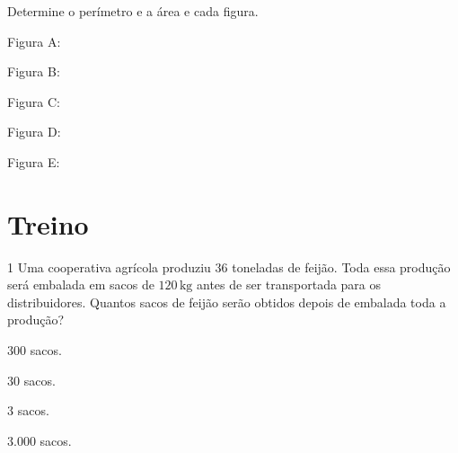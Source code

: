 {{{{\begin{escolha}
{Determine o perímetro e a área e cada figura.

\begin{escolha}
\item Figura A: 
\item Figura B: 
\item Figura C: 
\item Figura D: 
\item Figura E: 
\end{escolha}

\begin{mdframed}[linewidth=2pt,linecolor=white,roundcorner=10pt]
\vspace{6cm}
\end{mdframed}

\section*{Treino}

\num{1} Uma cooperativa agrícola produziu $36$ toneladas de feijão. Toda essa
produção será embalada em sacos de $120\,\text{kg}$ antes de ser transportada para
os distribuidores. Quantos sacos de feijão serão obtidos depois de
embalada toda a produção?

\begin{multicols}{2}
\begin{escolha}
\item $300$ sacos.
\item $30$ sacos.
\item $3$ sacos.
\item $3.000$ sacos.
\end{escolha}
\end{multicols}


}
\end{escolha}}}}}
